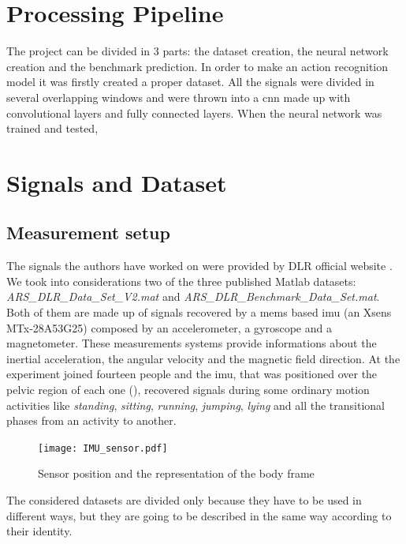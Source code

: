 
\section{Processing Pipeline}
\label{sec:processing_architecture}
The project can be divided in 3 parts: the dataset creation, the neural network creation and the benchmark prediction.
In order to make an action recognition model it was firstly created a proper dataset. All the signals were divided in several overlapping windows and were thrown into a \gls{cnn} made up with convolutional layers and fully connected layers.
When the neural network was trained and tested, 


\section{Signals and Dataset}
\label{sec:model}

\subsection{Measurement setup}
The signals the authors have worked on were provided by DLR official website \cite{DLR}. We took into considerations two of the three published Matlab datasets: \textit{ARS\_DLR\_Data\_Set\_V2.mat} and \textit{ARS\_DLR\_Benchmark\_Data\_Set.mat}. 
Both of them are made up of signals recovered by a \gls{mems} based \gls{imu} (an Xsens MTx-28A53G25) composed by an accelerometer, a gyroscope and a magnetometer. These measurements systems provide informations about the inertial acceleration, the angular velocity and the magnetic field direction.
At the experiment joined fourteen people and the \gls{imu}, that was positioned over the pelvic region of each one (), recovered signals during some ordinary motion activities like \textit{standing}, \textit{sitting}, \textit{running}, \textit{jumping}, \textit{lying} and all the transitional phases from an activity to another.

\begin{figure}[htp]
\texttt{[image: IMU\_sensor.pdf]}
\caption{Sensor position and the representation of the body frame}
\label{fig:IMU}
\end{figure}

The considered datasets are divided only because they have to be used in different ways, but they are going to be described in the same way according to their identity.

